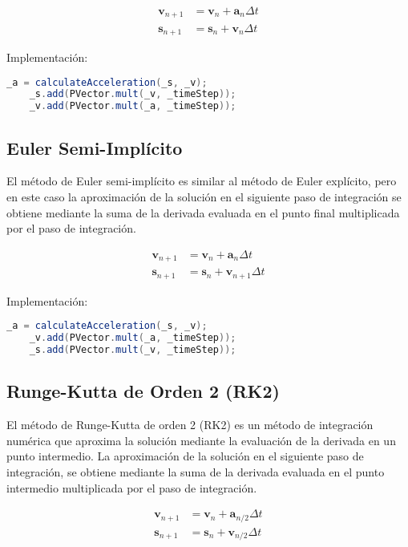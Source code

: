 \documentclass{article}
\begin{document}
\begin{align*}
    \mathbf{v}_{n+1} & = \mathbf{v}_n + \mathbf{a}_n \Delta t \\
    \mathbf{s}_{n+1} & = \mathbf{s}_n + \mathbf{v}_n \Delta t
\end{align*}

Implementación:
\begin{lstlisting}[language = Java, frame = single]
    _a = calculateAcceleration(_s, _v);
    _s.add(PVector.mult(_v, _timeStep));
    _v.add(PVector.mult(_a, _timeStep));
\end{lstlisting}

\subsection{Euler Semi-Implícito}

El método de Euler semi-implícito es similar al método de Euler explícito, pero en este caso la aproximación de la solución en el siguiente paso de integración se obtiene mediante la suma de la derivada evaluada en el punto final multiplicada por el paso de integración.

\begin{align*}
    \mathbf{v}_{n+1} & = \mathbf{v}_n + \mathbf{a}_{n} \Delta t   \\
    \mathbf{s}_{n+1} & = \mathbf{s}_n + \mathbf{v}_{n+1} \Delta t
\end{align*}

Implementación:
\begin{lstlisting}[language = Java, frame = single]
    _a = calculateAcceleration(_s, _v);
    _v.add(PVector.mult(_a, _timeStep));
    _s.add(PVector.mult(_v, _timeStep));
\end{lstlisting}

\subsection{Runge-Kutta de Orden 2 (RK2)}

El método de Runge-Kutta de orden 2 (RK2) es un método de integración numérica que aproxima la solución mediante la evaluación de la derivada en un punto intermedio. La aproximación de la solución en el siguiente paso de integración, se obtiene mediante la suma de la derivada evaluada en el punto intermedio multiplicada por el paso de integración.

\begin{align*}
    \mathbf{v}_{n+1} & = \mathbf{v}_n + \mathbf{a}_{n/2} \Delta t \\
    \mathbf{s}_{n+1} & = \mathbf{s}_n + \mathbf{v}_{n/2} \Delta t
\end{align*}
\end{document}
